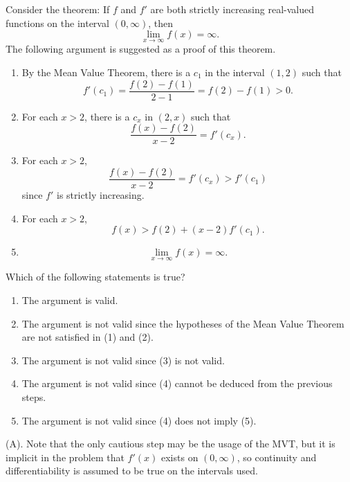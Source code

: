 \begin{exercise}
Consider the theorem: If $f$ and $f'$ are both strictly increasing real-valued
functions on the interval $(0,\infty)$, then
\[
\lim_{x\to\infty} f(x)=\infty.
\]
The following argument is suggested as a proof of this theorem.

\begin{enumerate}
    \item By the Mean Value Theorem, there is a $c_1$ in the interval
    $(1,2)$ such that
    \[
    f'(c_1)
    =
    \frac{f(2)-f(1)}{2-1}
    =
    f(2)-f(1)>0.
    \]

    \item For each $x>2$, there is a $c_x$ in $(2,x)$ such that
    \[
    \frac{f(x)-f(2)}{x-2}=f'(c_x).
    \]

    \item For each $x>2$,
    \[
    \frac{f(x)-f(2)}{x-2}
    =
    f'(c_x)>f'(c_1)
    \]
    since $f'$ is strictly increasing.

    \item For each $x>2$,
    \[
    f(x)>f(2)+(x-2)f'(c_1).
    \]

    \item
    \[
    \lim_{x\to\infty}f(x)=\infty.
    \]
\end{enumerate}
Which of the following statements is true?

\begin{enumerate}[label=(\Alph*)]
    \item The argument is valid.
    \item The argument is not valid since the hypotheses of the Mean Value
    Theorem are not satisfied in (1) and (2).
    \item The argument is not valid since (3) is not valid.
    \item The argument is not valid since (4) cannot be deduced from the
    previous steps.
    \item The argument is not valid since (4) does not imply (5).
\end{enumerate}
\end{exercise}
\begin{solution}
(A). Note that the only cautious step may be the usage of the MVT, but 
it is implicit in the problem that $f'(x)$ exists on $(0, \infty)$, so continuity 
and differentiability is assumed to be true on the intervals used.
\end{solution}


